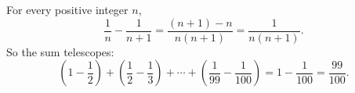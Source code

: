 For every positive integer $n$,
\[\dfrac{1}{n}-\dfrac{1}{n+1}=\dfrac{(n+1)-n}{n(n+1)}=\dfrac{1}{n(n+1)}.\]
So the sum telescopes:
\[\left(1-\dfrac{1}{2}\right)+\left(\dfrac{1}{2}-\dfrac{1}{3}\right)+\cdots+\left(\dfrac{1}{99}-\dfrac{1}{100}\right)=1-\dfrac{1}{100}=\boxed{\dfrac{99}{100}}.\]
